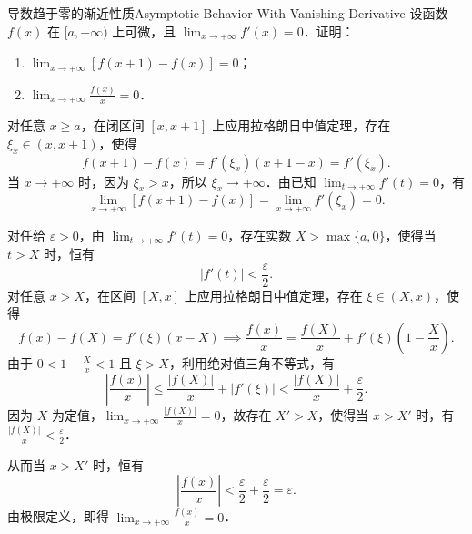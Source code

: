 \begin{problem}{导数趋于零的渐近性质}{Asymptotic-Behavior-With-Vanishing-Derivative}
    设函数 $f(x)$ 在 $[a, +\infty)$ 上可微，且 $\lim_{x\to +\infty} f'(x) = 0$．证明：
    \begin{enumerate}
        \item $\lim_{x\to +\infty} [f(x+1) - f(x)] = 0$；
        \item $\lim_{x\to +\infty} \frac{f(x)}{x} = 0$．
    \end{enumerate}
\end{problem}

\begin{myproof}

    对任意 $x \geqslant a$，在闭区间 $[x, x+1]$ 上应用拉格朗日中值定理，存在 $\xi_x \in (x, x+1)$，使得
    \begin{equation}
        f(x+1) - f(x) = f'(\xi_x)(x+1 - x) = f'(\xi_x).
    \end{equation}
    当 $x \to +\infty$ 时，因为 $\xi_x > x$，所以 $\xi_x \to +\infty$．由已知 $\lim_{t\to +\infty} f'(t) = 0$，有
    \begin{equation}
        \lim_{x\to +\infty} [f(x+1) - f(x)] = \lim_{x\to +\infty} f'(\xi_x) = 0.
    \end{equation}


    对任给 $\varepsilon > 0$，由 $\lim_{t\to +\infty} f'(t) = 0$，存在实数 $X > \max\{a, 0\}$，使得当 $t > X$ 时，恒有
    \begin{equation}
        |f'(t)| < \frac{\varepsilon}{2}.
    \end{equation}
    对任意 $x > X$，在区间 $[X, x]$ 上应用拉格朗日中值定理，存在 $\xi \in (X, x)$，使得
    \begin{equation}
        f(x) - f(X) = f'(\xi)(x - X) \implies \frac{f(x)}{x} = \frac{f(X)}{x} + f'(\xi)\left( 1 - \frac{X}{x} \right).
    \end{equation}
    由于 $0 < 1 - \frac{X}{x} < 1$ 且 $\xi > X$，利用绝对值三角不等式，有
    \begin{equation}
        \left| \frac{f(x)}{x} \right| \leqslant \frac{|f(X)|}{x} + |f'(\xi)| < \frac{|f(X)|}{x} + \frac{\varepsilon}{2}.
    \end{equation}
    因为 $X$ 为定值，$\lim_{x\to +\infty} \frac{|f(X)|}{x} = 0$，故存在 $X' > X$，使得当 $x > X'$ 时，有 $\frac{|f(X)|}{x} < \frac{\varepsilon}{2}$．

    从而当 $x > X'$ 时，恒有
    \begin{equation}
        \left| \frac{f(x)}{x} \right| < \frac{\varepsilon}{2} + \frac{\varepsilon}{2} = \varepsilon.
    \end{equation}
    由极限定义，即得 $\lim_{x\to +\infty} \frac{f(x)}{x} = 0$．
\end{myproof}

